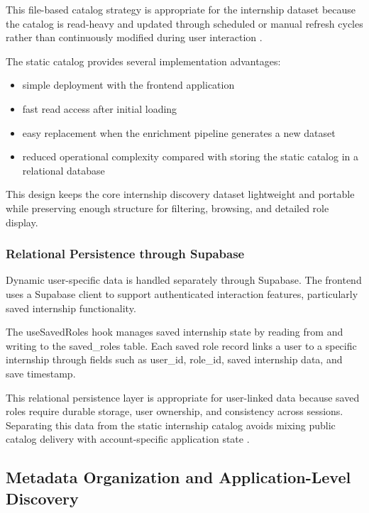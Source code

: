 This file-based catalog strategy is appropriate for the internship dataset because the catalog is read-heavy and updated through scheduled or manual refresh cycles rather than continuously modified during user interaction \cite{kleppmann2017designing}.

The static catalog provides several implementation advantages:

\begin{itemize}
\item simple deployment with the frontend application
\item fast read access after initial loading
\item easy replacement when the enrichment pipeline generates a new dataset
\item reduced operational complexity compared with storing the static catalog in a relational database
\end{itemize}

This design keeps the core internship discovery dataset lightweight and portable while preserving enough structure for filtering, browsing, and detailed role display.

\subsubsection*{Relational Persistence through Supabase}

Dynamic user-specific data is handled separately through Supabase. The frontend uses a Supabase client to support authenticated interaction features, particularly saved internship functionality.

The useSavedRoles hook manages saved internship state by reading from and writing to the saved\_roles table. Each saved role record links a user to a specific internship through fields such as user\_id, role\_id, saved internship data, and save timestamp.

This relational persistence layer is appropriate for user-linked data because saved roles require durable storage, user ownership, and consistency across sessions. Separating this data from the static internship catalog avoids mixing public catalog delivery with account-specific application state \cite{codd1970relational, kleppmann2017designing}.

\subsection{Metadata Organization and Application-Level Discovery}

